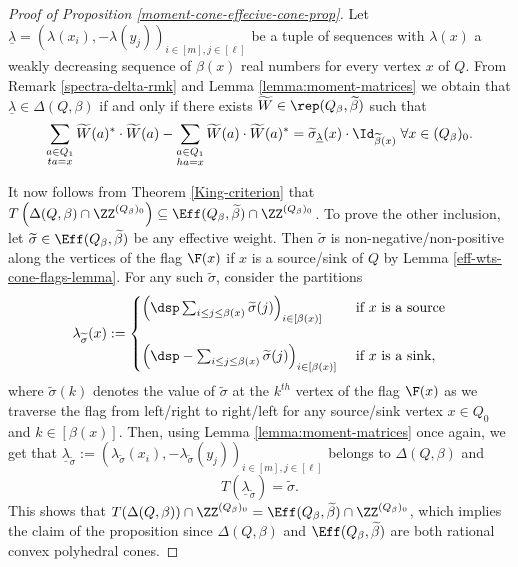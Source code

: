 \begin{proof}[Proof of Proposition \ref{moment-cone-effecive-cone-prop}]
Let $\underline{\lambda} = (\lambda(x_i), -\lambda(y_j))_{i \in [m], j \in [\ell]}$ be a tuple of sequences with $\lambda(x)$ a weakly decreasing sequence of $\beta(x)$ real numbers for every vertex $x$ of $Q$. From Remark \ref{spectra-delta-rmk} and Lemma \ref{lemma:moment-matrices} we obtain that $\underline{\lambda} \in \Delta(Q, \beta)$ if and only if there exists $\widetilde{W} \in \rep(Q_\beta, \widetilde{\beta})$ such that 
	\[
	\sum_{\substack{a \in Q_1 \\ ta=x}} \widetilde{W}(a)^* \cdot \widetilde{W}(a) - \sum_{\substack{a \in Q_1 \\ ha=x}} \widetilde{W}(a) \cdot \widetilde{W}(a)^* = \widetilde{\sigma}_{\underline{\lambda}}(x) \cdot \Id_{\widetilde{\beta}(x)} \; \forall x \in (Q_\beta)_0.
	\]

It now follows from Theorem \ref{King-criterion} that $T\left(\Delta(Q,\beta) \cap \ZZ^{(Q_\beta)_0}\right) \subseteq \Eff(Q_\beta, \widetilde{\beta}) \cap \ZZ^{(Q_\beta)_0}$. To prove the other inclusion, let $\widetilde{\sigma} \in \Eff(Q_\beta,\widetilde{\beta})$ be any effective weight. Then $\widetilde{\sigma}$ is  non-negative/non-positive along the vertices of the flag $\F(x)$ if $x$ is a source/sink of $Q$ by Lemma \ref{eff-wts-cone-flags-lemma}. For any such $\widetilde{\sigma}$, consider the partitions
\[
\lambda_{\widetilde{\sigma}}(x) : = \begin{cases} 
\left( \dsp \sum_{i \leq j \leq \beta(x)} \widetilde{\sigma}(j) \right)_{i \in [\beta(x)]} & \mbox{ if } x \text{ is a source} \\
\\
\left( \dsp -\sum_{i \leq j \leq \beta(x)} \widetilde{\sigma}(j)\right)_{i \in [\beta(x)]} & \mbox{ if } x \text{ is a sink},
\end{cases}
\]
where $\widetilde{\sigma}(k)$ denotes the value of $\widetilde{\sigma}$ at the $k^{th}$ vertex of the flag $\F(x)$ as we traverse the flag from left/right to right/left for any source/sink vertex $x \in Q_0$ and $k \in [\beta(x)]$. Then, using Lemma \ref{lemma:moment-matrices} once again, we get that $\underline{\lambda}_{\widetilde{\sigma}}:=(\lambda_{\widetilde{\sigma}}(x_i), -\lambda_{\widetilde{\sigma}}(y_j))_{i \in [m], j\in [\ell]}$ belongs to $\Delta(Q, \beta)$ and
$$
T(\underline{\lambda}_{\widetilde{\sigma}}) = \widetilde{\sigma}.
$$
This shows that 
$T(\Delta(Q,\beta)) \cap \ZZ^{(Q_\beta)_0} = \Eff(Q_\beta, \widetilde{\beta}) \cap \ZZ^{(Q_\beta)_0}$, which implies the claim of the proposition since $\Delta(Q,\beta)$ and $\Eff(Q_\beta,\widetilde{\beta})$ are both rational convex polyhedral cones.
\end{proof}

